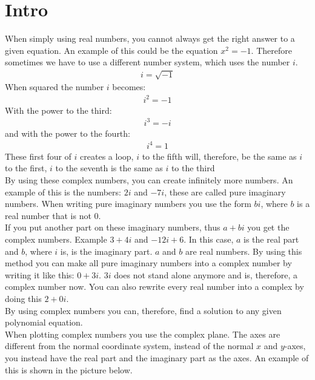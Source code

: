 \section{Intro}
When simply using real numbers, you cannot always get the right answer to a given equation. An example of this could be the equation $x^2=-1$. Therefore sometimes we have to use a different number system, which uses the number $i$. 
\begin{align*}
i=\sqrt{-1}
\end{align*}
When squared the number $i$ becomes:
\begin{align*}
i^2=-1
\end{align*}
With the power to the third:
\begin{align*}
i^3=-i
\end{align*}
and with the power to the fourth:
\begin{align*}
i^4=1
\end{align*}
These first four of $i$ creates a loop, $i$ to the fifth will, therefore, be the same as $i$ to the first, $i$ to the seventh is the same as $i$ to the third \\
By using these complex numbers, you can create infinitely more numbers.  
An example of this is the numbers: $2i$ and $-7i$, these are called pure imaginary numbers. When writing pure imaginary numbers you use the form $bi$, where $b$ is a real number that is not $0$. \\
If you put another part on these imaginary numbers, thus $a+bi$ you get the complex numbers. Example $3+4i$ and $-12i+6$. In this case, $a$ is the real part and $b$, where $i$ is, is the imaginary part. $a$ and $b$ are real numbers. By using this method you can make all pure imaginary numbers into a complex number by writing it like this: $0+3i$. $3i$ does not stand alone anymore and is, therefore, a complex number now. You can also rewrite every real number into a complex by doing this $2+0i$. \\
By using complex numbers you can, therefore, find a solution to any given polynomial equation. \\ 
When plotting complex numbers you use the complex plane. The axes are different from the normal coordinate system, instead of the normal $x$ and $y$-axes, you instead have the real part and the imaginary part as the axes. An example of this is shown in the picture below.
